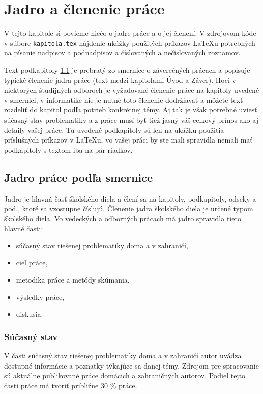 \chapter{Jadro a členenie práce}

\label{kap:clenenie} %

V tejto kapitole si povieme niečo o jadre práce a o jej členení. V
zdrojovom kóde v súbore \verb'kapitola.tex' nájdenie ukážky použitých
príkazov LaTeXu potrebných na písanie nadpisov a podnadpisov a
číslovaných a nečíslovaných zoznamov.

Text podkapitoly \ref{sec:jadro} je
prebratý zo smernice o záverečných prácach \cite[článok 5]{smernica} a popisuje typické členenie jadra práce (text medzi kapitolami Úvod a Záver). Hoci v niektorých študijných odboroch je vyžadované členenie práce na kapitoly uvedené v smernici, v informatike nie je nutné toto členenie dodržiavať a môžete text rozdeliť do kapitol podľa potrieb konkrétnej témy. Aj tak je však potrebné uviesť súčasný stav problematiky a z práce musí byť tiež jasný váš celkový prínos ako aj detaily vašej práce. Tu uvedené podkapitoly sú len na ukážku použitia príslušných príkazov v LaTeXu, vo vašej práci by ste mali spravidla nemali mať podkapitoly s textom iba na pár riadkov.

\section{Jadro práce podľa smernice}
\label{sec:jadro}
Jadro je hlavná časť školského diela a člení sa na kapitoly,
podkapitoly, odseky a pod., ktoré sa vzostupne číslujú.
Členenie jadra školského diela je určené typom  školského diela. Vo vedeckých
a odborných prácach má jadro spravidla tieto hlavné časti:
\begin{itemize}
    \item  súčasný stav riešenej problematiky doma a v zahraničí,
    \item  cieľ práce,
    \item  metodika práce a metódy skúmania,
    \item  výsledky práce,
    \item  diskusia.
\end{itemize}

\subsection{Súčasný stav}
V časti súčasný stav riešenej problematiky doma a v zahraničí autor uvádza
dostupné informácie a poznatky týkajúce sa danej témy. Zdrojom pre spracovanie sú
aktuálne publikované práce domácich a zahraničných autorov.  Podiel tejto časti práce
má tvoriť približne 30 \% práce.

